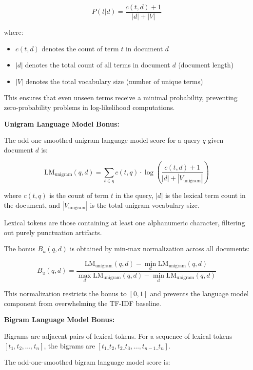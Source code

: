 \[
P(t|d) = \frac{c(t,d) + 1}{|d| + |V|}
\]

where:
\begin{itemize}
    \item $c(t,d)$ denotes the count of term $t$ in document $d$
    \item $|d|$ denotes the total count of all terms in document $d$ (document length)
    \item $|V|$ denotes the total vocabulary size (number of unique terms)
\end{itemize}

This ensures that even unseen terms receive a minimal probability, preventing zero-probability problems in log-likelihood computations.

\vspace{0.3cm}

\textbf{Unigram Language Model Bonus:}

The add-one-smoothed unigram language model score for a query $q$ given document $d$ is:

\[
\text{LM}_{\text{unigram}}(q,d) = \sum_{t \in q} c(t,q) \cdot \log\left(\frac{c(t,d) + 1}{|d| + |V_{\text{unigram}}|}\right)
\]

where $c(t,q)$ is the count of term $t$ in the query, $|d|$ is the lexical term count in the document, and $|V_{\text{unigram}}|$ is the total unigram vocabulary size.

Lexical tokens are those containing at least one alphanumeric character, filtering out purely punctuation artifacts.

The bonus $B_u(q,d)$ is obtained by min-max normalization across all documents:

\[
B_u(q,d) = \frac{\text{LM}_{\text{unigram}}(q,d) - \min_d \text{LM}_{\text{unigram}}(q,d)}{\max_d \text{LM}_{\text{unigram}}(q,d) - \min_d \text{LM}_{\text{unigram}}(q,d)}
\]

This normalization restricts the bonus to $[0, 1]$ and prevents the language model component from overwhelming the TF-IDF baseline.

\vspace{0.3cm}

\textbf{Bigram Language Model Bonus:}

Bigrams are adjacent pairs of lexical tokens. For a sequence of lexical tokens $[t_1, t_2, \ldots, t_n]$, the bigrams are $[t_1\text{\_}t_2, t_2\text{\_}t_3, \ldots, t_{n-1}\text{\_}t_n]$.

The add-one-smoothed bigram language model score is:

